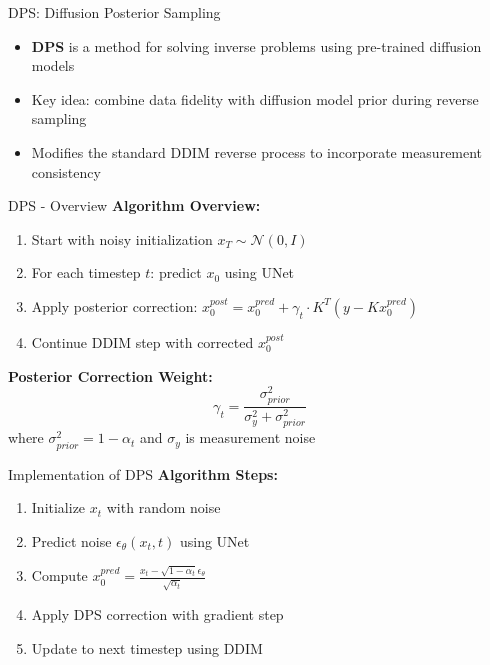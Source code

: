 \begin{frame}{DPS: Diffusion Posterior Sampling}
  \begin{itemize}
    \item \textbf{DPS} is a method for solving inverse problems using pre-trained diffusion models
    \item Key idea: combine data fidelity with diffusion model prior during reverse sampling
    \item Modifies the standard DDIM reverse process to incorporate measurement consistency
  \end{itemize}
\end{frame}


\begin{frame}{DPS - Overview}
  \textbf{Algorithm Overview:}
  \begin{enumerate}
    \item Start with noisy initialization $x_T \sim \mathcal{N}(0, I)$
    \item For each timestep $t$: predict $x_0$ using UNet
    \item Apply posterior correction: $x_0^{post} = x_0^{pred} + \gamma_t \cdot K^T(y - K x_0^{pred})$
    \item Continue DDIM step with corrected $x_0^{post}$
  \end{enumerate}

  \textbf{Posterior Correction Weight:}
  $$\gamma_t = \frac{\sigma_{prior}^2}{\sigma_y^2 + \sigma_{prior}^2}$$
  where $\sigma_{prior}^2 = 1 - \alpha_t$ and $\sigma_y$ is measurement noise
\end{frame}

\begin{frame}{Implementation of DPS}
  \textbf{Algorithm Steps:}
  \begin{enumerate}
    \item Initialize $x_t$ with random noise
    \item Predict noise $\epsilon_\theta(x_t, t)$ using UNet
    \item Compute $x_0^{pred} = \frac{x_t - \sqrt{1-\alpha_t} \epsilon_\theta}{\sqrt{\alpha_t}}$
    \item Apply DPS correction with gradient step
    \item Update to next timestep using DDIM
  \end{enumerate}
\end{frame}

